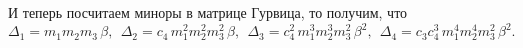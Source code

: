 И теперь посчитаем миноры в матрице Гурвица, то получим, что
\begin{equation*}
    \Delta_1 = m_1 m_2 m_3 \, \beta, \ \ 
    \Delta_2 = c_4 \, m_1^2 m_2^2 m_3^2 \, \beta, \ \ 
    \Delta_3 = c_4^2 \, m_1^3 m_2^3 m_3^2 \, \beta^2, \ \ 
    \Delta_4 = c_3  c_4^3 \, m_1^4  m_2^4 m_3^2 \, \beta^2.
\end{equation*}